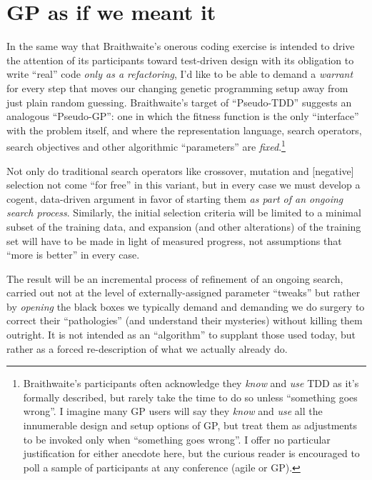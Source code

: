 \section{GP as if we meant it}\hypertarget{gp-as-if-we-meant-it}{}\label{gp-as-if-we-meant-it}

In the same way that Braithwaite's onerous coding exercise is intended to drive the attention of its participants toward test-driven design with its obligation to write ``real'' code \emph{only as a refactoring}, I'd like to be able to demand a \emph{warrant} for every step that moves our changing genetic programming setup away from just plain random guessing. Braithwaite's target of ``Pseudo-TDD'' suggests an analogous ``Pseudo-GP'': one in which the fitness function is the only ``interface'' with the problem itself, and where the representation language, search operators, search objectives and other algorithmic ``parameters'' are \emph{fixed}.\footnote{Braithwaite's participants often acknowledge they \emph{know} and \emph{use} TDD as it's formally described, but rarely take the time to do so unless ``something goes wrong''. I imagine many GP users will say they \emph{know} and \emph{use} all the innumerable design and setup options of GP, but treat them as adjustments to be invoked only when ``something goes wrong''. I offer no particular justification for either anecdote here, but the curious reader is encouraged to poll a sample of participants at any conference (agile or GP).}

Not only do traditional search operators like crossover, mutation and [negative] selection not come ``for free'' in this variant, but in every case we must develop a cogent, data-driven argument in favor of starting them \emph{as part of an ongoing search process}. Similarly, the initial selection criteria will be limited to a minimal subset of the training data, and expansion (and other alterations) of the training set will have to be made in light of measured progress, not assumptions that ``more is better'' in every case.

The result will be an incremental process of refinement of an ongoing search, carried out not at the level of externally-assigned parameter ``tweaks'' but rather by \emph{opening} the black boxes we typically demand and demanding we do surgery to correct their ``pathologies'' (and understand their mysteries) without killing them outright. It is not intended as an ``algorithm'' to supplant those used today, but rather as a forced re-description of what we actually already do.

